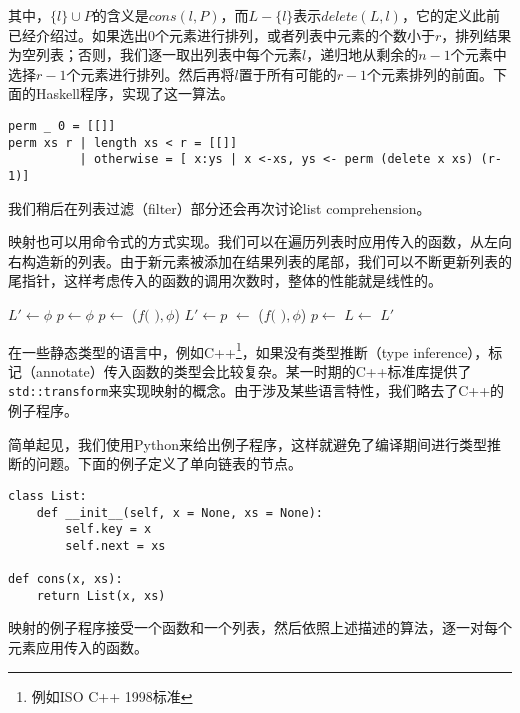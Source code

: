 \documentclass[UTF8]{article}
\begin{document}
其中，$\{l\} \cup P$的含义是$cons(l, P)$，而$L-\{l\}$表示$delete(L, l)$，它的定义此前已经介绍过。如果选出0个元素进行排列，或者列表中元素的个数小于$r$，排列结果为空列表；否则，我们逐一取出列表中每个元素$l$，递归地从剩余的$n-1$个元素中选择$r-1$个元素进行排列。然后再将$l$置于所有可能的$r-1$个元素排列的前面。下面的Haskell程序，实现了这一算法。

\lstset{language=Haskell}
\begin{lstlisting}[style=Haskell]
perm _ 0 = [[]]
perm xs r | length xs < r = [[]]
          | otherwise = [ x:ys | x <-xs, ys <- perm (delete x xs) (r-1)]
\end{lstlisting}

我们稍后在列表过滤（filter）部分还会再次讨论list comprehension。

映射也可以用命令式的方式实现。我们可以在遍历列表时应用传入的函数，从左向右构造新的列表。由于新元素被添加在结果列表的尾部，我们可以不断更新列表的尾指针，这样考虑传入的函数的调用次数时，整体的性能就是线性的。

\begin{algorithmic}[1]
  \State $L' \gets \phi$
  \State $p \gets \phi$
      \State $p \gets$ ($f($  $), \phi$)
      \State $L' \gets p$
    \Else
      \State {} $\gets$ ($f($  $), \phi$)
      \State $p \gets$ 
    \EndIf
    \State $L \gets$ 
  \EndWhile
  \State \Return $L'$
\EndFunction
\end{algorithmic}

在一些静态类型的语言中，例如C++\footnote{例如ISO C++ 1998标准}，如果没有类型推断（type inference），标记（annotate）传入函数的类型会比较复杂\cite{sgi-stl-transform}。某一时期的C++标准库提供了\verb|std::transform|来实现映射的概念。由于涉及某些语言特性，我们略去了C++的例子程序。

简单起见，我们使用Python来给出例子程序，这样就避免了编译期间进行类型推断的问题。下面的例子定义了单向链表的节点。

\lstset{language=Python}
\begin{lstlisting}
class List:
    def __init__(self, x = None, xs = None):
        self.key = x
        self.next = xs

def cons(x, xs):
    return List(x, xs)
\end{lstlisting}

映射的例子程序接受一个函数和一个列表，然后依照上述描述的算法，逐一对每个元素应用传入的函数。
\end{document}
